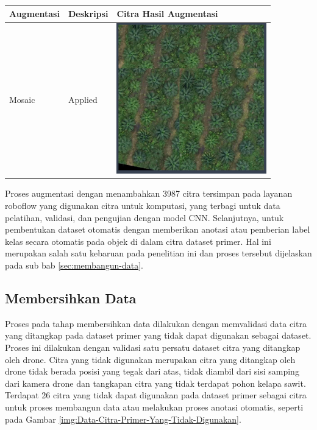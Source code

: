 
\begin{singlespace}
	\begin{table}[H]
		\centering
		\begin{tabular}{|p{3cm}|p{3cm}|p{6cm}|}
			\hline
			\rowcolor[HTML]{D9D9D9} 
			Augmentasi & Deskripsi                                                                & Citra Hasil Augmentasi \\ \hline
			
			
			Mosaic & Applied & \includegraphics[width=0.4\columnwidth]{bab4/Gambar/tbl-5-pic7.png}\\ \hline
			
		\end{tabular}
	\end{table}
\end{singlespace}

Proses augmentasi dengan menambahkan 3987 citra tersimpan pada layanan roboflow yang digunakan citra untuk komputasi, yang terbagi untuk data pelatihan, validasi, dan pengujian dengan model CNN. Selanjutnya, untuk pembentukan dataset otomatis dengan memberikan anotasi atau pemberian label kelas secara otomatis pada objek di dalam citra dataset primer. Hal ini merupakan salah satu kebaruan pada penelitian ini dan proses tersebut dijelaskan pada sub bab \ref{sec:membangun-data}.

\subsection{Membersihkan Data}
\hspace{1,2cm}
Proses pada tahap membersihkan data dilakukan dengan memvalidasi data citra yang ditangkap pada dataset primer yang tidak dapat digunakan sebagai dataset. Proses ini dilakukan dengan validasi satu persatu dataset citra yang ditangkap oleh drone. Citra yang tidak digunakan merupakan citra yang ditangkap oleh drone tidak berada posisi yang tegak dari atas, tidak diambil dari sisi samping dari kamera drone dan tangkapan citra yang tidak terdapat pohon kelapa sawit. Terdapat 26 citra yang tidak dapat digunakan pada dataset primer sebagai citra untuk proses membangun data atau melakukan proses anotasi otomatis, seperti pada Gambar \ref{img:Data-Citra-Primer-Yang-Tidak-Digunakan}.

